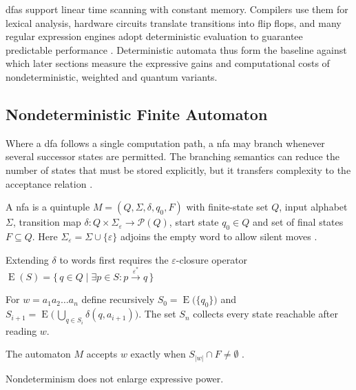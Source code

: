 \glspl{dfa} support linear time scanning with constant memory.
Compilers use them for lexical analysis, hardware circuits translate
transitions into flip flops, and many regular expression engines adopt
deterministic evaluation to guarantee predictable performance
\cite{aho1974design}.  Deterministic automata thus form the
baseline against which later sections measure the expressive gains and
computational costs of nondeterministic, weighted and quantum variants.

\subsection{Nondeterministic Finite Automaton}\label{subsec:nfa}

Where a \gls{dfa} follows a single computation path, a \gls{nfa} may
branch whenever several successor states are permitted.  The branching
semantics can reduce the number of states that must be stored
explicitly, but it transfers complexity to the acceptance relation
\cite{rabin1959finite}.

\begin{definition}\label{def:nfa}
A \gls{nfa} is a quintuple
$M=(Q,\Sigma,\delta,q_{0},F)$ with
finite-state set $Q$, input alphabet $\Sigma$, transition map
$\delta\colon Q{\times}\Sigma_{\varepsilon}\to\mathcal{P}(Q)$,
start state $q_{0}\in Q$ and set of final states $F\subseteq Q$.
Here $\Sigma_{\varepsilon}=\Sigma\cup\{\varepsilon\}$ adjoins the empty
word to allow silent moves \cite{rabin1959finite}.
\end{definition}

Extending $\delta$ to words first requires the
$\varepsilon$-closure operator
$\operatorname{E}(S)=
  \bigl\{\,q\in Q\mid
          \exists p\in S\colon
          p\xrightarrow{\varepsilon^{\ast}} q\,\bigr\}$

For $w=a_{1}a_{2}\dots a_{n}$ define recursively  
$S_{0}=\operatorname{E}\bigl(\{q_{0}\}\bigr)$ and  
$S_{i+1}=  
\operatorname{E}\bigl(\,\bigcup_{q\in S_{i}}\delta(q,a_{i+1})\bigr)$.
The set $S_{n}$ collects every state reachable after reading $w$.

\begin{lemma}\label{lem:nfa-accept}
The automaton $M$ accepts $w$ exactly when
$S_{|w|}\cap F\neq\emptyset$ \cite{hopcroft2001introduction}.
\end{lemma}

Nondeterminism does not enlarge expressive power.

